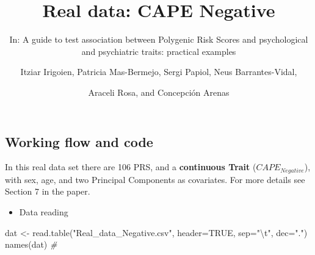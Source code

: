 \documentclass[
]{article}
\title{Real data: CAPE Negative}
\subtitle{In: A guide to test association between Polygenic Risk Scores
and psychological and psychiatric traits: practical examples}
\author{Itziar Irigoien, Patricia Mas-Bermejo, Sergi Papiol, Neus
Barrantes-Vidal, \and Araceli Rosa, and Concepción Arenas}
\date{}
\newenvironment{Shaded}{\begin{snugshade}}{\end{snugshade}}
\newcommand{\AttributeTok}[1]{\textcolor[rgb]{0.77,0.63,0.00}{#1}}
\newcommand{\CommentTok}[1]{\textcolor[rgb]{0.56,0.35,0.01}{\textit{#1}}}
\newcommand{\ConstantTok}[1]{\textcolor[rgb]{0.00,0.00,0.00}{#1}}
\newcommand{\FunctionTok}[1]{\textcolor[rgb]{0.00,0.00,0.00}{#1}}
\newcommand{\NormalTok}[1]{#1}
\newcommand{\OtherTok}[1]{\textcolor[rgb]{0.56,0.35,0.01}{#1}}
\newcommand{\SpecialCharTok}[1]{\textcolor[rgb]{0.00,0.00,0.00}{#1}}
\newcommand{\StringTok}[1]{\textcolor[rgb]{0.31,0.60,0.02}{#1}}
\providecommand{\tightlist}{%
  \setlength{\itemsep}{0pt}\setlength{\parskip}{0pt}}
\begin{document}
\maketitle

\hypertarget{working-flow-and-code}{%
\subsection{Working flow and code}\label{working-flow-and-code}}

In this real data set there are 106 PRS, and a \textbf{continuous Trait}
(\(CAPE_{Negative}\)), with sex, age, and two Principal Components as
covariates. For more details see Section 7 in the paper.

\begin{itemize}
\tightlist
\item
  Data reading
\end{itemize}

\begin{Shaded}
\begin{Highlighting}[]
\NormalTok{dat }\OtherTok{\textless{}{-}} \FunctionTok{read.table}\NormalTok{(}\StringTok{"Real\_data\_Negative.csv"}\NormalTok{, }\AttributeTok{header=}\ConstantTok{TRUE}\NormalTok{, }\AttributeTok{sep=}\StringTok{"}\SpecialCharTok{\textbackslash{}t}\StringTok{"}\NormalTok{, }\AttributeTok{dec=}\StringTok{"."}\NormalTok{)}
\FunctionTok{names}\NormalTok{(dat) }\CommentTok{\#}
\end{Highlighting}
\end{Shaded}
\end{document}
